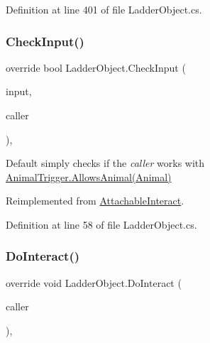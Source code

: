 Definition at line 401 of file Ladder\+Object.\+cs.

\mbox{\label{class_ladder_object_aa18c443d78ab35fa3aba0d6ce7328539}} 
\subsubsection{\texorpdfstring{Check\+Input()}{CheckInput()}}
{\footnotesize\ttfamily override bool Ladder\+Object.\+Check\+Input (\begin{DoxyParamCaption}\item[{Input\+Control}]{input,  }\item[{\mbox{\hyperlink{class_animal}{Animal}}}]{caller }\end{DoxyParamCaption})\hspace{0.3cm}{\ttfamily [protected]}, {\ttfamily [virtual]}}



Default simply checks if the {\itshape caller}  works with \mbox{\hyperlink{class_animal_trigger_ae8394dfcf5f91b8c413959a4d6baa3a9}{Animal\+Trigger.\+Allows\+Animal(\+Animal)}} 



Reimplemented from \mbox{\hyperlink{class_attachable_interact_a7efc3c845dc5112e6c744eee254094e6}{Attachable\+Interact}}.



Definition at line 58 of file Ladder\+Object.\+cs.

\mbox{\label{class_ladder_object_ad7c09ffac9842f0a4ffb799f5caa78cf}} 
\subsubsection{\texorpdfstring{Do\+Interact()}{DoInteract()}}
{\footnotesize\ttfamily override void Ladder\+Object.\+Do\+Interact (\begin{DoxyParamCaption}\item[{\mbox{\hyperlink{class_animal}{Animal}}}]{caller }\end{DoxyParamCaption})\hspace{0.3cm}{\ttfamily [protected]}, {\ttfamily [virtual]}}



